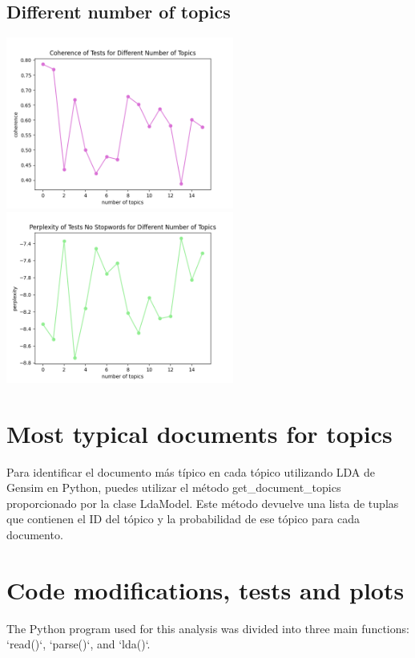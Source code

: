 \documentclass[10pt]{article} %
\begin{document}
	\subsection{Different number of topics}
	\begin{center}
		\includegraphics[width=7.5cm]{images/coherence_no_stopwords_diff_n_topics_2}
		\includegraphics[width=7.5cm]{images/perplexity_no_stopwords_diff_n_topics_2}
	\end{center}
	
	\section{Most typical documents for topics}
	Para identificar el documento más típico en cada tópico utilizando LDA de Gensim en Python, puedes utilizar el método get\_document\_topics proporcionado por la clase LdaModel. Este método devuelve una lista de tuplas que contienen el ID del tópico y la probabilidad de ese tópico para cada documento.
	
	
	\section{Code modifications, tests and plots}
	
	The Python program used for this analysis was divided into three main functions: `read()`, `parse()`, and `lda()`.
	
\end{document}
